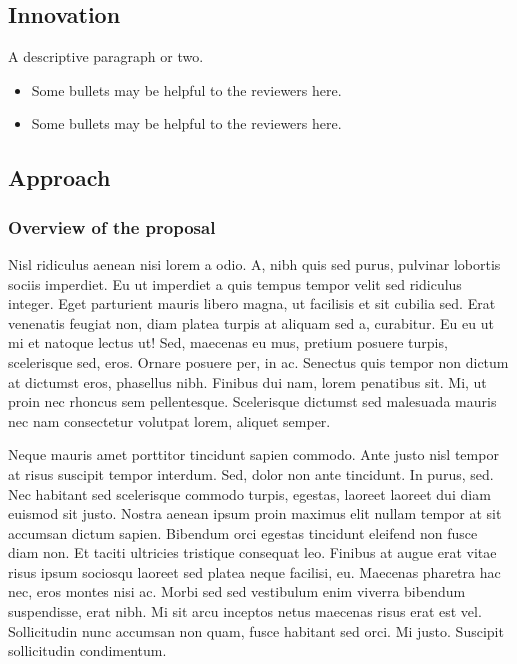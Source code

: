 \documentclass[11pt,]{article}
\providecommand{\tightlist}{%
  \setlength{\itemsep}{0pt}\setlength{\parskip}{0pt}}
\begin{document}
\hypertarget{innovation}{%
\subsection{Innovation}\label{innovation}}

A descriptive paragraph or two.

\begin{itemize}
\tightlist
\item
  Some bullets may be helpful to the reviewers here.
\item
  Some bullets may be helpful to the reviewers here.
\end{itemize}

\hypertarget{approach}{%
\subsection{Approach}\label{approach}}

\hypertarget{overview-of-the-proposal}{%
\subsubsection{Overview of the
proposal}\label{overview-of-the-proposal}}

Nisl ridiculus aenean nisi lorem a odio. A, nibh quis sed purus,
pulvinar lobortis sociis imperdiet. Eu ut imperdiet a quis tempus tempor
velit sed ridiculus integer. Eget parturient mauris libero magna, ut
facilisis et sit cubilia sed. Erat venenatis feugiat non, diam platea
turpis at aliquam sed a, curabitur. Eu eu ut mi et natoque lectus ut!
Sed, maecenas eu mus, pretium posuere turpis, scelerisque sed, eros.
Ornare posuere per, in ac. Senectus quis tempor non dictum at dictumst
eros, phasellus nibh. Finibus dui nam, lorem penatibus sit. Mi, ut proin
nec rhoncus sem pellentesque. Scelerisque dictumst sed malesuada mauris
nec nam consectetur volutpat lorem, aliquet semper.

Neque mauris amet porttitor tincidunt sapien commodo. Ante justo nisl
tempor at risus suscipit tempor interdum. Sed, dolor non ante tincidunt.
In purus, sed. Nec habitant sed scelerisque commodo turpis, egestas,
laoreet laoreet dui diam euismod sit justo. Nostra aenean ipsum proin
maximus elit nullam tempor at sit accumsan dictum sapien. Bibendum orci
egestas tincidunt eleifend non fusce diam non. Et taciti ultricies
tristique consequat leo. Finibus at augue erat vitae risus ipsum
sociosqu laoreet sed platea neque facilisi, eu. Maecenas pharetra hac
nec, eros montes nisi ac. Morbi sed sed vestibulum enim viverra bibendum
suspendisse, erat nibh. Mi sit arcu inceptos netus maecenas risus erat
est vel. Sollicitudin nunc accumsan non quam, fusce habitant sed orci.
Mi justo. Suscipit sollicitudin condimentum.
\end{document}
